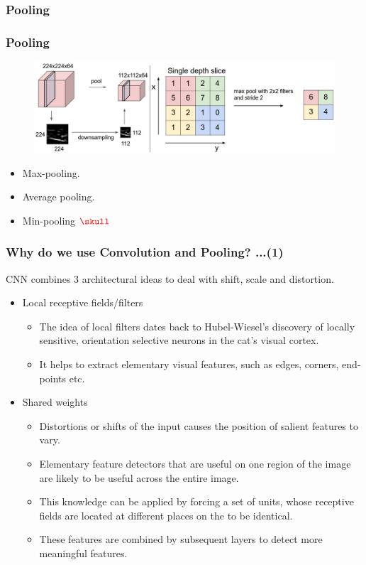 \documentclass{beamer}
\newcommand*{\mathcolor}{}
\def\mathcolor#1#{\mathcoloraux{#1}}
\newcommand*{\mathcoloraux}[3]{%
  \protect\leavevmode
  \begingroup
    \color#1{#2}#3%
  \endgroup
}
\begin{document}
\subsubsection{Pooling}

\begin{frame}
	\frametitle{Pooling}
	\begin{figure}
		\includegraphics[scale=0.23]{./figures/edit/max_pool.png}
	\end{figure}	
		\begin{itemize}
		\item Max-pooling.
		\item Average pooling.
		\pause
		\item Min-pooling 
		\pause
		$\mathcolor{red}{ \skull } $
	\end{itemize}	
\end{frame}

\begin{frame}
	\frametitle{Why do we use Convolution and Pooling? ...(1)}
	CNN combines 3 architectural ideas to deal with shift, scale and distortion.
	\begin{itemize}
		\item Local receptive fields/filters 
		\begin{itemize}
			\item The idea of local filters dates back to Hubel-Wiesel's discovery of locally sensitive, orientation selective neurons in the cat's visual cortex.
			\item It helps to extract elementary visual features, such as edges, corners, end-points etc. 
		\end{itemize}
		\item Shared weights
		\begin{itemize}
			\item Distortions or shifts of the input causes the position of salient features to vary.			
			\item Elementary feature detectors that are useful on one region of the image are likely to be useful across the entire image. 
			\item This knowledge can be applied by forcing a set of units, whose receptive fields are located at different places on the to be identical.
			\item These features are combined by subsequent layers to detect more meaningful features.			
		\end{itemize}
	\end{itemize}
\end{frame}
\end{document}
